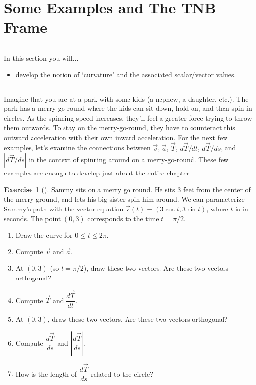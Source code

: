 \documentclass[10pt,]{book}
\theoremstyle{plain}
\theoremstyle{definition}
\theoremstyle{definition}
\theoremstyle{definition}
\theoremstyle{definition}
\newtheorem{exploration}[project]{Exercise}
\newenvironment{objectives}[1]{\noindent\rule{\linewidth}{0.1ex}\newline{\textbf{{\large#1}}\par\smallskip}}{\par\noindent\rule{\linewidth}{0.1ex}\par\smallskip}
\theoremstyle{definition}
\numberwithin{equation}{section}
\begin{document}
\section[{Some Examples and The TNB Frame}]{Some Examples and The TNB Frame}\label{ch08_03_curvature}
\begin{objectives}{Objectives}\label{objectives-18}
In this section you will...%
%
\begin{itemize}[label=\textbullet]
\item{}develop the notion of `curvature' and the associated scalar/vector values.%
\end{itemize}
\end{objectives}
Imagine that you are at a park with some kids (a nephew, a daughter, etc.). The park has a merry-go-round where the kids can sit down, hold on, and then spin in circles. As the spinning speed increases, they'll feel a greater force trying to throw them outwards. To stay on the merry-go-round, they have to counteract this outward acceleration with their own inward acceleration. For the next few examples, let's examine the connections between \(\vec v\), \(\vec a\), \(\vec T\), \(d\vec T/dt\), \(d\vec T/ds\), and \(|d\vec T/ds|\) in the context of spinning around on a merry-go-round. These few examples are enough to develop just about the entire chapter.%
\begin{exploration}[]\label{exploration-168}
Sammy sits on a merry go round. He sits 3 feet from the center of the merry ground, and lets his big sister spin him around. We can parameterize Sammy's path with the vector equation \(\vec r(t) = (3\cos t, 3\sin t)\), where \(t\) is in seconds. The point \((0,3)\) corresponds to the time \(t=\pi/2\).%
\begin{enumerate}[font=\bfseries,label=(\alph*),ref=\alph*]
\item\label{task-401} Draw the curve for \(0\leq t\leq 2\pi\).%
\item\label{task-402} Compute \(\vec v\) and \(\vec a\).%
\item\label{task-403} At \((0,3)\) (so \(t=\pi/2\)), draw these two vectors. Are these two vectors orthogonal?%
\item\label{task-404} Compute \(\vec T\) and \(\dfrac{d\vec T}{dt}\).%
\item\label{task-405} At \((0,3)\), draw these two vectors. Are these two vectors orthogonal?%
\item\label{task-406} Compute \(\dfrac{d\vec T}{ds}\) and \(\left|\dfrac{d\vec T}{ds}\right|\).%
\item\label{task-407} How is the length of \(\dfrac{d\vec T}{ds}\) related to the circle?%
\end{enumerate}
\end{exploration}
\end{document}
